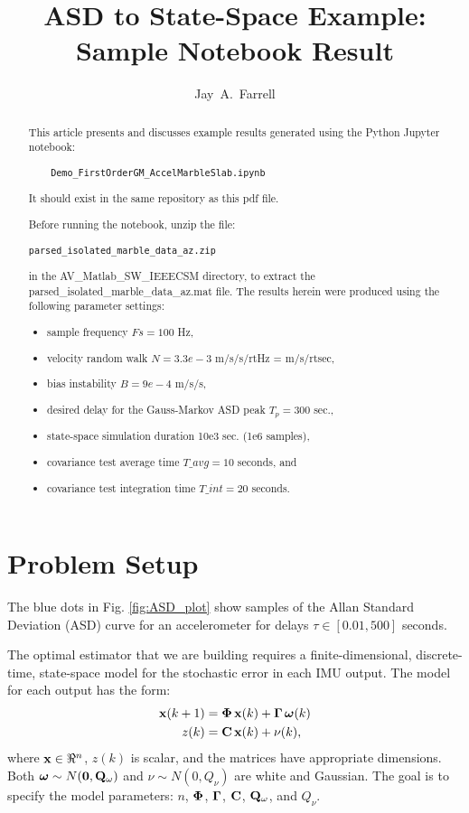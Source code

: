 \documentclass[letter,twocolumn]{article}
\begin{document}
	\title{ASD to State-Space Example: Sample Notebook Result}
\author{Jay~A.~Farrell}
\maketitle

\begin{abstract}
This article presents and discusses example results generated using the Python Jupyter notebook:
\begin{verbatim}
	Demo_FirstOrderGM_AccelMarbleSlab.ipynb
\end{verbatim}
It should exist in the same repository as this pdf file. 

Before running the notebook, unzip the file:
\begin{verbatim}
parsed_isolated_marble_data_az.zip
\end{verbatim} 
in the AV\_Matlab\_SW\_IEEECSM directory,
to extract the parsed\_isolated\_marble\_data\_az.mat file.
The results herein were produced using the following parameter settings: 
\begin{itemize}
	\item sample frequency $Fs = 100$ Hz,
	\item velocity random walk $N  = 3.3e-3$ m/s/s/rtHz = m/s/rtsec,
	\item bias instability $B  = 9e-4$ m/s/s,
	\item desired delay for the Gauss-Markov ASD peak $T_p = 300$ sec.,
	\item state-space simulation duration 10e3 sec. (1e6 samples),
	\item covariance test average time $T\_avg = 10$ seconds, and
	\item covariance test integration time $T\_int = 20$ seconds.
\end{itemize}
\end{abstract}

\section{Problem Setup}
The blue dots in Fig. \ref{fig:ASD_plot} show samples of the Allan Standard Deviation (ASD) curve for an accelerometer for delays $\tau\in[0.01, 500]$ seconds.


The optimal estimator that we are building requires a finite-dimensional, discrete-time, state-space model for the stochastic error in each IMU output.
The model for each output has the form:
\begin{align}
	\mathbf{x}(k+1) &= \boldsymbol{\Phi}\, \mathbf{x}(k) + \boldsymbol{\Gamma} \, \boldsymbol{\omega}(k) \\
	z(k)   &= \mathbf{C} \,  \mathbf{x}(k) + \nu(k),
\end{align}
where $\mathbf{x}\in\Re^n$, $z(k)$ is scalar, and the matrices have appropriate dimensions. 
Both $\boldsymbol{\omega}\sim N(\boldsymbol{0},\mathbf{Q}_\omega)$ and $\nu\sim N(0,Q_\nu)$ are white and Gaussian. 
The goal is to specify the model parameters: $n$, $\boldsymbol{\Phi}$, $\boldsymbol{\Gamma}$, $\mathbf{C}$, $\mathbf{Q}_\omega$, and $Q_\nu$.
\end{document}
